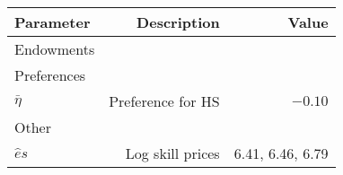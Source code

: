 \begin{tabular}{lrr}
\hline
Parameter & Description  & Value  \\ 
\hline
Endowments &   &   \\ 
Preferences &   &   \\ 
$\bar{\eta}$ & Preference for HS  & $-0.10$  \\ 
Other &   &   \\ 
$\hat{e}{s}$ & Log skill prices  & 6.41, 6.46, 6.79  \\ 
\hline
\end{tabular}%
